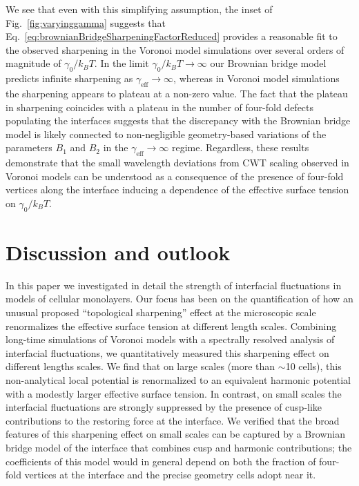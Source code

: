 \documentclass[twoside,twocolumn,9pt]{article}
\begin{document}
We see that even with this simplifying assumption, the inset of Fig.~\ref{fig:varyinggamma} suggests that Eq.~\ref{eq:brownianBridgeSharpeningFactorReduced} provides a reasonable fit to the observed sharpening in the Voronoi model simulations over several orders of magnitude of $\gamma_{0}/{k}_{B}T$. In the limit $\gamma_{0}/{k}_{B}T\rightarrow\infty$ our Brownian bridge model predicts infinite sharpening as $\gamma_{\text{eff}}\rightarrow\infty$, whereas in Voronoi model simulations the sharpening appears to plateau at a non-zero value. The fact that the plateau in sharpening coincides with a plateau in the number of four-fold defects populating the interfaces suggests that the discrepancy with the Brownian bridge model is likely connected to non-negligible geometry-based variations of the parameters $B_{1}$ and $B_{2}$ in the $\gamma_{\text{eff}}\rightarrow\infty$ regime. Regardless, these results demonstrate that the small wavelength deviations from CWT scaling observed in Voronoi models can be understood as a consequence of the presence of four-fold vertices along the interface inducing a dependence of the effective surface tension on $\gamma_{0}/k_{B}T$.






\section{Discussion and outlook}

In this paper we investigated in detail the strength of interfacial fluctuations in models of cellular monolayers. Our focus has been on the quantification of how an unusual proposed ``topological sharpening'' effect at the microscopic scale renormalizes the effective surface tension at different length scales. Combining long-time simulations of Voronoi models with a spectrally resolved analysis of interfacial fluctuations, we quantitatively measured this sharpening effect on different lengths scales. We find that on large scales (more than $\sim$10 cells), this non-analytical local potential is renormalized to an equivalent harmonic potential with a modestly larger effective surface tension. In contrast, on small scales the interfacial fluctuations are strongly suppressed by the presence of  cusp-like contributions to the restoring  force at the interface. We verified that the broad features of this sharpening effect on small scales can be captured by a Brownian bridge model of the interface that combines cusp and harmonic contributions; the coefficients of this model would in general depend on both the fraction of four-fold vertices  at  the interface and the precise geometry cells adopt near it. 
\end{document}
